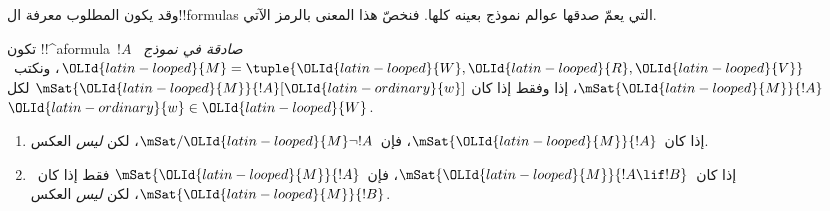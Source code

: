 \documentclass[../../../include/open-logic-section]{subfiles}
\begin{document}


وقد يكون المطلوب معرفة ال!!{formula}s التي يعمّ صدقها عوالم نموذج
بعينه كلها. فنخصّ هذا المعنى بالرمز الآتي.

\begin{defn}
  تكون !!^a{formula}~$!A$ \emph{صادقة في نموذج}~${\OLId{latin-looped}{M}} = \tuple{{\OLId{latin-looped}{W}}, {\OLId{latin-looped}{R}},
    {\OLId{latin-looped}{V}}}$، ونكتب~$\mSat{{\OLId{latin-looped}{M}}}{!A}$، إذا وفقط إذا كان
  $\mSat{{\OLId{latin-looped}{M}}}{!A}[{\OLId{latin-ordinary}{w}}]$ لكل~${\OLId{latin-ordinary}{w}} \in {\OLId{latin-looped}{W}}$.
\end{defn}

\begin{prop}
  \begin{enumerate}
  \item إذا كان~$\mSat{{\OLId{latin-looped}{M}}}{!A}$، فإن~$\mSat/{{\OLId{latin-looped}{M}}}{\lnot !A}$، لكن
    \emph{ليس} العكس.
  \item إذا كان~$\mSat{{\OLId{latin-looped}{M}}}{!A \lif !B}$، فإن~$\mSat{{\OLId{latin-looped}{M}}}{!A}$ فقط إذا
    كان~$\mSat{{\OLId{latin-looped}{M}}}{!B}$، لكن \emph{ليس} العكس.
  \end{enumerate}
\end{prop}
\end{document}

